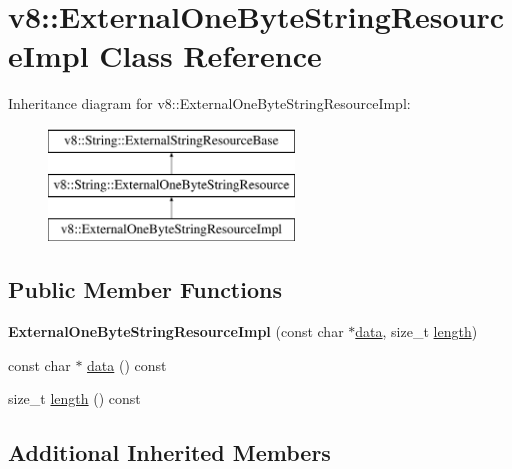 \hypertarget{classv8_1_1ExternalOneByteStringResourceImpl}{}\section{v8\+:\+:External\+One\+Byte\+String\+Resource\+Impl Class Reference}
\label{classv8_1_1ExternalOneByteStringResourceImpl}
Inheritance diagram for v8\+:\+:External\+One\+Byte\+String\+Resource\+Impl\+:\begin{figure}[H]
\begin{center}
\leavevmode
\includegraphics[height=3.000000cm]{classv8_1_1ExternalOneByteStringResourceImpl}
\end{center}
\end{figure}
\subsection*{Public Member Functions}
\begin{DoxyCompactItemize}
\item 
\mbox{\label{classv8_1_1ExternalOneByteStringResourceImpl_a46178fb208419f5ea99552871b3a373e}} 
{\bfseries External\+One\+Byte\+String\+Resource\+Impl} (const char $\ast$\mbox{\hyperlink{classv8_1_1ExternalOneByteStringResourceImpl_a417ecb5eb304b12c8806ff6d0306bc09}{data}}, size\+\_\+t \mbox{\hyperlink{classv8_1_1ExternalOneByteStringResourceImpl_a4015ab4f74c209ac484e5183b2039f58}{length}})
\item 
const char $\ast$ \mbox{\hyperlink{classv8_1_1ExternalOneByteStringResourceImpl_a417ecb5eb304b12c8806ff6d0306bc09}{data}} () const
\item 
size\+\_\+t \mbox{\hyperlink{classv8_1_1ExternalOneByteStringResourceImpl_a4015ab4f74c209ac484e5183b2039f58}{length}} () const
\end{DoxyCompactItemize}
\subsection*{Additional Inherited Members}


